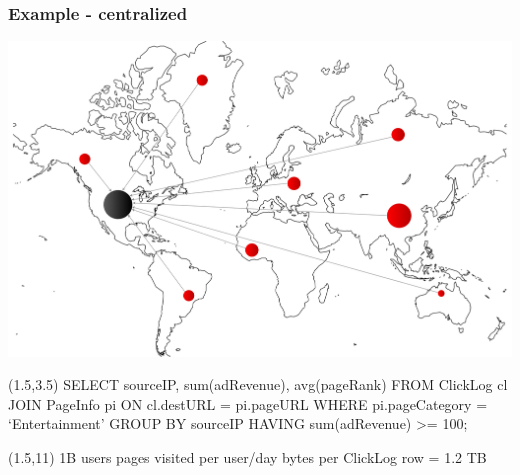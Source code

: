\documentclass{beamer}
\begin{document}
\begin{frame}
	\frametitle{Example - centralized}

	{\includegraphics[width=\textwidth]{./images/centralized.png}}

	\begin{textblock}{11}(1.5,3.5)
		SELECT sourceIP, sum(adRevenue), avg(pageRank)
		\break
		FROM ClickLog cl
		\break
		JOIN PageInfo pi ON cl.destURL = pi.pageURL
		\break
		WHERE pi.pageCategory = `Entertainment'
		\break
		GROUP BY sourceIP
		\break
		HAVING sum(adRevenue) >= 100;
	\end{textblock}

	\begin{textblock}{7}(1.5,11)
		1B users
		 pages visited per user/day
		 bytes per ClickLog row
		\hline
		\vspace{4px}
		= 1.2 TB
	\end{textblock}
\end{frame}
\end{document}
